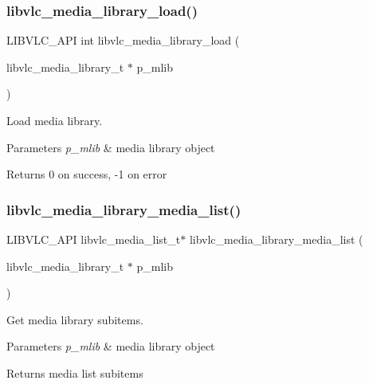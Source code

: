 \subsubsection{\texorpdfstring{libvlc\+\_\+media\+\_\+library\+\_\+load()}{libvlc\_media\_library\_load()}}
{\footnotesize\ttfamily L\+I\+B\+V\+L\+C\+\_\+\+A\+PI int libvlc\+\_\+media\+\_\+library\+\_\+load (\begin{DoxyParamCaption}\item[{libvlc\+\_\+media\+\_\+library\+\_\+t $\ast$}]{p\+\_\+mlib }\end{DoxyParamCaption})}

Load media library.


\begin{DoxyParams}{Parameters}
{\em p\+\_\+mlib} & media library object \\
\hline
\end{DoxyParams}
\begin{DoxyReturn}{Returns}
0 on success, -\/1 on error 
\end{DoxyReturn}
\mbox{\label{group__libvlc__media__library_gad20c729c7f90d6295bf8a0e350977892}} 
\subsubsection{\texorpdfstring{libvlc\+\_\+media\+\_\+library\+\_\+media\+\_\+list()}{libvlc\_media\_library\_media\_list()}}
{\footnotesize\ttfamily L\+I\+B\+V\+L\+C\+\_\+\+A\+PI libvlc\+\_\+media\+\_\+list\+\_\+t$\ast$ libvlc\+\_\+media\+\_\+library\+\_\+media\+\_\+list (\begin{DoxyParamCaption}\item[{libvlc\+\_\+media\+\_\+library\+\_\+t $\ast$}]{p\+\_\+mlib }\end{DoxyParamCaption})}

Get media library subitems.


\begin{DoxyParams}{Parameters}
{\em p\+\_\+mlib} & media library object \\
\hline
\end{DoxyParams}
\begin{DoxyReturn}{Returns}
media list subitems 
\end{DoxyReturn}
\mbox{\label{group__libvlc__media__library_gaa1ae63d96da4224df7d3cdf4ceee37df}} 
